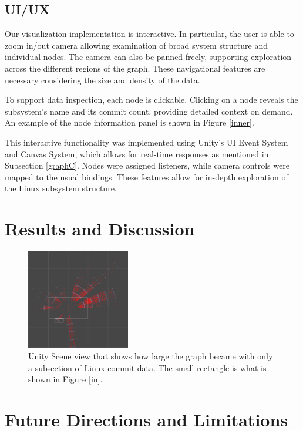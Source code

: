 \documentclass[conference]{IEEEtran}
\begin{document}
\subsection{UI/UX}
Our visualization implementation is interactive. In particular, the user is able to zoom in/out camera allowing examination of broad system structure and individual nodes. The camera can also be panned freely, supporting exploration across the different regions of the graph. These navigational features are necessary considering the size and density of the data. 

To support data inspection, each node is clickable. Clicking on a node reveals the subsystem’s name and its commit count, providing detailed context on demand. An example of the node information panel is shown in Figure \ref{inner}.

This interactive functionality was implemented using Unity's UI Event System and Canvas System, which allows for real-time responses as mentioned in Subsection \ref{graphC}. Nodes were assigned listeners, while camera controls were mapped to the usual bindings. These features allow for in-depth exploration of the Linux subsystem structure.





\section{Results and Discussion}
\label{resAndDisc}



\begin{figure}[h!]
	\centering
	\includegraphics[width=0.4\textwidth]{wholeThingMostly.png}
	\caption{Unity Scene view that shows how large the graph became with only a subsection of Linux commit data. The small rectangle is what is shown in Figure \ref{in}.}
	\label{out}
\end{figure}

\section{Future Directions and Limitations}
\label{futDir}
\end{document}
